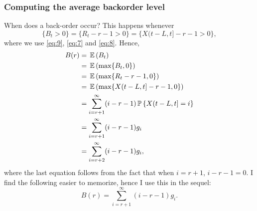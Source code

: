\subsubsection{Computing the average backorder level}


When does a back-order occur? This happens whenever
\begin{equation}
  \label{eq:11}
   \{B_t > 0\} = \{R_t - r-1>0\} = \{X(t-L, t] - r-1>0\},
\end{equation}
where we use \ref{eq:9}, \ref{eq:7} and \ref{eq:8}. Hence,
\begin{equation*}
   \begin{split}
     B(r) 
   &= \,\mathbb{E}\,(B_t) \\
   &= \,\mathbb{E}\,(\max\{B_t, 0\}) \\
   &= \,\mathbb{E}\,(\max\{R_t - r - 1, 0\}) \\
   &= \,\mathbb{E}\,(\max\{X(t-L, t] - r - 1, 0\}) \\
   &= \sum_{i=r+1}^\infty (i- r -1)\,\mathbb{P}\,\{X(t-L, t] = i\}\\
   &= \sum_{i=r+1}^\infty (i- r -1)g_i \\
   &= \sum_{i=r+2}^\infty (i- r -1)g_i,
     \end{split}
\end{equation*}
where the last equation follows from the fact that when $i=r+1$,
$i-r-1 =0$. I find the following easier to memorize, hence I use this
in the sequel:
\begin{equation}
  \label{eq:12}
   B(r)  = \sum_{i=r+1}^\infty (i- r -1)g_i.
\end{equation}

